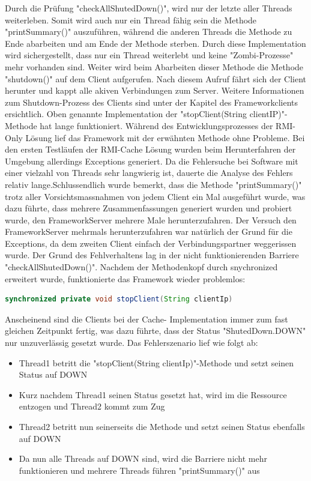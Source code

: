 Durch die Prüfung "checkAllShutedDown()", wird nur der letzte aller Threads weiterleben. Somit wird auch nur ein Thread fähig sein die Methode "printSummary()" auszuführen, während die anderen Threads die Methode zu Ende abarbeiten und am Ende der Methode sterben. Durch diese Implementation wird sichergestellt, dass nur ein Thread weiterlebt und keine "Zombi-Prozesse" mehr vorhanden sind.\newline
Weiter wird beim Abarbeiten dieser Methode die Methode "shutdown()" auf dem Client aufgerufen. Nach diesem Aufruf fährt sich der Client herunter und kappt alle akiven Verbindungen zum Server. Weitere Informationen zum Shutdown-Prozess des Clients sind unter der Kapitel des Frameworkclients ersichtlich.\newline
Oben genannte Implementation der "stopClient(String clientIP)"-Methode hat lange funktioniert. Während des Entwicklungsprozesses der RMI-Only Lösung lief das Framework mit der erwähnten Methode ohne Probleme. Bei den ersten Testläufen der RMI-Cache Lösung wurden beim Herunterfahren der Umgebung allerdings Exceptions generiert. Da die Fehlersuche bei Software mit einer vielzahl von Threads sehr langwierig ist, dauerte die Analyse des Fehlers relativ lange.\newline Schlussendlich wurde bemerkt, dass die Methode "printSummary()" trotz aller Vorsichtsmassnahmen von jedem Client ein Mal ausgeführt wurde, was dazu führte, dass mehrere Zusammenfassungen generiert wurden und probiert wurde, den FrameworkServer mehrere Male herunterzufahren. Der Versuch den FrameworkServer mehrmals herunterzufahren war natürlich der Grund für die Ex\-cep\-tions, da dem zweiten Client ein\-fach der Ver\-bin\-dungs\-part\-ner weggerissen wurde.\newline
Der Grund des Fehlverhaltens lag in der nicht funktionierenden Barriere "checkAllShutedDown()". Nachdem der Methodenkopf durch snychronized erweitert wurde, funktionierte das Framework wieder problemlos:
\begin{lstlisting}[language=java, breaklines=true]
synchronized private void stopClient(String clientIp)
\end{lstlisting}
Anscheinend sind die Clients bei der Cache- Implementation immer zum fast gleichen Zeit\-punkt fer\-tig, was dazu führte, dass der Sta\-tus "ShutedDown.DOWN" nur un\-zu\-ver\-läs\-sig gesetzt wurde. Das Fehlerszenario lief wie folgt ab:
\begin{itemize}
\item Thread1 betritt die "stopClient(String clientIp)"-Methode und setzt seinen Status auf DOWN
\item Kurz nachdem Thread1 seinen Status gesetzt hat, wird im die Res\-sour\-ce entzogen und Thread2 kommt zum Zug
\item Thread2 betritt nun seinerseits die Methode und setzt seinen Status ebenfalls auf DOWN
\item Da nun alle Threads auf DOWN sind, wird die Barriere nicht mehr funktionieren und mehrere Threads führen "printSummary()" aus
\end{itemize}
